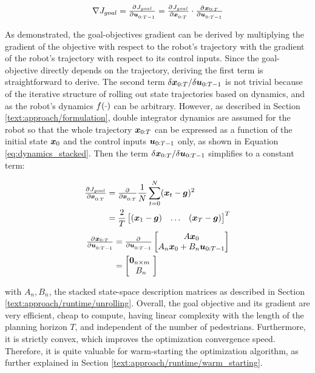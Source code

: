 \begin{equation}
\nabla J_{goal} = \pd{J_{goal}}{\u_{0:T-1}} = \pd{J_{goal}}{\x_{0:T}} \cdot \pd{\x_{0:T}}{\u_{0:T-1}}
\end{equation}

As demonstrated, the goal-objectives gradient can be derived by multiplying the gradient of the objective with respect to the robot's trajectory with the gradient of the robot's trajectory with respect to its control inputs. Since the goal-objective directly depends on the trajectory, deriving the first term is straightforward to derive. The second term $\delta \boldsymbol{x}_{0:T} / \delta \boldsymbol{u}_{0:T-1}$ is not trivial because of the iterative structure of rolling out state trajectories based on dynamics, and as the robot's dynamics $f(\cdot)$ can be arbitrary. However, as described in Section \ref{text:approach/formulation}, double integrator dynamics are assumed for the robot so that the whole trajectory $\boldsymbol{x}_{0:T}$ can be expressed as a function of the initial state $\boldsymbol{x}_0$ and the control inputs $\boldsymbol{u}_{0:T-1}$ only, as shown in Equation \ref{eq:dynamics_stacked}. Then the term $\delta \boldsymbol{x}_{0:T} / \delta \boldsymbol{u}_{0:T-1}$ simplifies to a constant term:

\begin{align}
\pd{J_{goal}}{\x_{0:T}} &= \pd{}{\x_{0:T}} \frac{1}{N} \sum_{t = 0}^N (\x_t - \goal)^2 \\
&= \frac{2}{T} \begin{bmatrix} (\x_1 - \goal) & \hdots & (\x_T - \goal) \end{bmatrix}^T
\end{align}
\begin{align}
\pd{\x_{0:T}}{\u_{0:T-1}} &= \pd{}{\u_{0:T-1}} \begin{bmatrix} A \x_0 \\ A_n \x_0 + B_n \u_{0:T-1} \end{bmatrix} \\
&= \begin{bmatrix} \boldsymbol{0}_{n \times m} \\ B_n \end{bmatrix}
\label{eq:goal_gradient_dynamics}
\end{align}

with $A_n, B_n$, the stacked state-space description matrices as described in Section \ref{text:approach/runtime/unrolling}.
\newline
Overall, the goal objective and its gradient are very efficient, cheap to compute, having linear complexity with the length of the planning horizon $T$, and independent of the number of pedestrians. Furthermore, it is strictly convex, which improves the optimization convergence speed. Therefore, it is quite valuable for warm-starting the optimization algorithm, as further explained in Section \ref{text:approach/runtime/warm_starting}.
